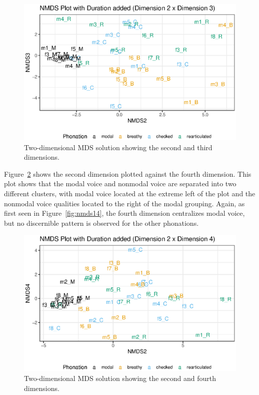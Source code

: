 \begin{figure}[!ht]
    \centering
    \includegraphics[width = 0.9\linewidth]{images/MDS/nmds23_dur.eps}
    \caption{Two-dimensional MDS solution showing the second and third dimensions.}
    \label{fig:nmds23}
\end{figure}

Figure~\ref{fig:nmds24} shows the second dimension plotted against the fourth dimension. This plot shows that the modal voice and nonmodal voice are separated into two different clusters, with modal voice located at the extreme left of the plot and the nonmodal voice qualities located to the right of the modal grouping. Again, as first seen in Figure~\ref{fig:nmds14}, the fourth dimension centralizes modal voice, but no discernible pattern is observed for the other phonations.

\begin{figure}[!h]
    \centering
    \includegraphics[width = \linewidth]{images/MDS/nmds24_dur.eps}
    \caption{Two-dimensional MDS solution showing the second and fourth dimensions.}
    \label{fig:nmds24}
\end{figure}

